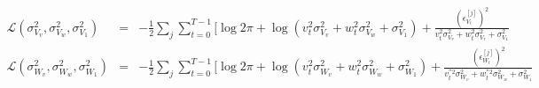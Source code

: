 \documentclass[12pt,draft]{dalcsthesis}
\begin{document}
\begin{eqnarray}
\mathcal{{L}}(\sigma_{V_{v}}^{2},\sigma_{V_{w}}^{2},\sigma_{V_{1}}^{2})&=&-\frac{1}{2}\sum_{j}\sum_{t=0}^{T-1}[\log2\pi+\log(v_{t}^{2}\sigma_{V_{v}}^{2}+w_{t}^{2}\sigma_{V_{w}}^{2}+\sigma_{V_{1}}^{2})+\frac{(\epsilon_{V_{t}}^{[j]})^{2}}{v_{t}^{2}\sigma_{V_{v}}^{2}+w_{t}^{2}\sigma_{V_{r}}^{2}+\sigma_{V_{1}}^{2}}\\
\mathcal{{L}}(\sigma_{W_{v}}^{2},\sigma_{W_{w}}^{2},\sigma_{W_{1}}^{2})&=&-\frac{1}{2}\sum_{j}\sum_{t=0}^{T-1}[\log2\pi+\log(v_{t}^{2}\sigma_{W_{v}}^{2}+w_{t}^{2}\sigma_{W_{w}}^{2}+\sigma_{W_{1}}^{2})+\frac{(\epsilon_{W_{t}}^{[j]})^{2}}{v_{t}^{''2}\sigma_{W_{v}}^{2}+w_{t}^{''2}\sigma_{W_{w}}^{2}+\sigma_{W_{1}}^{2}}
\end{eqnarray}
 
\end{document}
